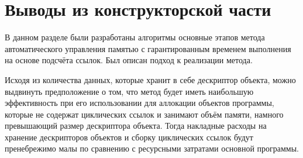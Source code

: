 




\section*{Выводы из конструкторской части}

В данном разделе были разработаны алгоритмы основные этапов метода автоматического управления памятью с гарантированным временем выполнения на основе подсчёта ссылок. Был описан подход к реализации метода.	

Исходя из количества данных, которые хранит в себе дескриптор объекта, можно выдвинуть предположение о том, что метод будет иметь наибольшую эффективность при его использовании для аллокации объектов программы, которые не содержат циклических ссылок и занимают объём памяти, намного превышающий размер дескриптора объекта. Тогда накладные расходы на хранение дескрипторов объектов и сборку циклических ссылок будут пренебрежимо малы по сравнению с ресурсными затратами основной программы.


